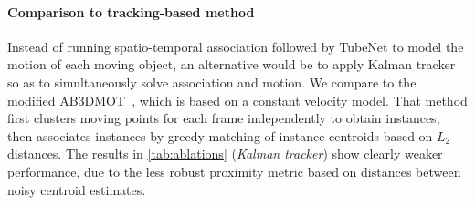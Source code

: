 \paragraph{Comparison to tracking-based method}
Instead of running spatio-temporal association followed by TubeNet to model the motion of each moving object, an alternative would be to apply Kalman tracker so as to simultaneously solve association and motion. We compare to the modified AB3DMOT~\cite{weng20203d}, which is based on a constant velocity model. That method first clusters moving points for each frame independently to obtain instances, then associates instances by greedy matching of instance centroids based on $L_2$ distances. The results in \cref{tab:ablations} (\textit{Kalman tracker}) show clearly weaker performance, due to the less robust proximity metric based on distances between noisy centroid estimates. 
